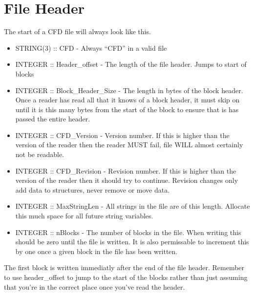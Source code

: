 \documentclass[8pt]{article}
\begin{document}
\section{File Header}
The start of a CFD file will always look like this.\\
\begin{itemize}
\item STRING(3) :: CFD - Always ``CFD'' in a valid file
\item INTEGER :: Header\_offset - The length of the file header. Jumps to start of blocks
\item INTEGER :: Block\_Header\_Size - The length in bytes of the block header. Once a reader has read all that it knows of a block header, it must skip on until it is this many bytes from the start of the block to ensure that is has passed the entire header.
\item INTEGER :: CFD\_Version - Version number. If this is higher than the version of the reader then the reader MUST fail, file WILL almost certainly not be readable.
\item INTEGER :: CFD\_Revision - Revision number. If this is higher than the version of the reader then it should try to continue. Revision changes only add data to structures, never remove or move data.
\item INTEGER :: MaxStringLen - All strings in the file are of this length. Allocate this much space for all future string variables.
\item INTEGER :: nBlocks - The number of blocks in the file. When writing this should be zero until the file is written. It is also permissable to increment this by one once a given block in the file has been written.
\end{itemize}
The first block is written immediatly after the end of the file header. Remember to use header\_offset to jump to the start of the blocks rather than just assuming that you're in the correct place once you've read the header.
\end{document}
